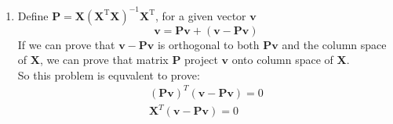 \documentclass[a4paper]{article}
\begin{document}
\begin{enumerate}
  \setlength{\itemsep}{3\parskip}
\item Define $\boldsymbol{P} = \boldsymbol{X}\left(\boldsymbol{X}^{\mathrm{T}} \boldsymbol{X}\right)^{-1} \boldsymbol{X}^{\mathrm{T}}$, for a given vector $\boldsymbol{v}$
\begin{equation*}
  \boldsymbol{v} = \boldsymbol{P} \boldsymbol{v}+ (\boldsymbol{v}-\boldsymbol{P} \boldsymbol{v})
\end{equation*}
If we can prove that $\boldsymbol{v}-\boldsymbol{P} \boldsymbol{v}$ is orthogonal to both $\boldsymbol{P} \boldsymbol{v}$ and the column space of $\boldsymbol{X}$,
we can prove that matrix $\boldsymbol{P}$ project $\boldsymbol{v}$ onto column space of $\boldsymbol{X}$.\\
So this problem is equvalent to prove:
  \begin{equation*}
    \begin{aligned}
      (\boldsymbol{P} \boldsymbol{v})^T (\boldsymbol{v}-\boldsymbol{P} \boldsymbol{v}) = 0\\
      \boldsymbol{X}^T (\boldsymbol{v}-\boldsymbol{P} \boldsymbol{v}) = 0\\
    \end{aligned}
    \label{eq:svm:p}
  \end{equation*}


\end{enumerate}
\end{document}
